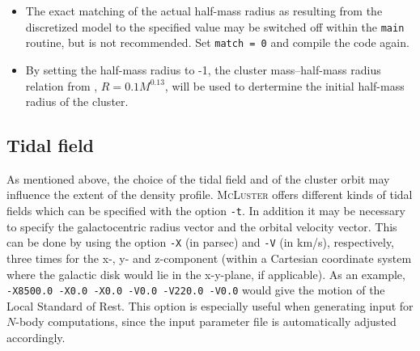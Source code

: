 \documentclass[useAMS,usenatbib]{mn2e}
\begin{document}
\begin{itemize}
\item The exact matching of the actual half-mass radius as resulting from the discretized model to the specified value may be switched off within the \texttt{main} routine, but is not recommended. Set \texttt{match = 0} and compile the code again.
\item By setting the half-mass radius to -1, the cluster mass--half-mass radius relation from \citet{Marks12}, $R = 0.1M^{0.13}$, will be used to dertermine the initial half-mass radius of the cluster.
\end{itemize}

\subsection*{Tidal field}
As mentioned above, the choice of the tidal field and of the cluster orbit may influence the extent of the density profile. \textsc{McLuster} offers different kinds of tidal fields which can be specified with the option \texttt{-t}. In addition it may be necessary to specify the galactocentric radius vector and the orbital velocity vector. This can be done by using the option \texttt{-X} (in parsec) and \texttt{-V} (in km/s), respectively, three times for the x-, y- and z-component (within a Cartesian coordinate system where the galactic disk would lie in the x-y-plane, if applicable). As an example, \texttt{-X8500.0 -X0.0 -X0.0 -V0.0 -V220.0 -V0.0} would give the motion of the Local Standard of Rest. This option is especially useful when generating input for $N$-body computations, since the input parameter file is automatically adjusted accordingly.
\end{document}
